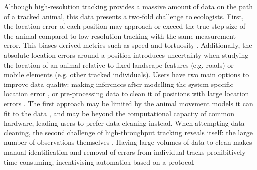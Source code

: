\documentclass[10pt,paper=a4,headings=standardclasses
]{scrartcl}
\begin{document}
Although high-resolution tracking provides a massive amount of data on the path of a tracked animal, this data presents a two-fold challenge to ecologists.
First, the location error of each position may approach or exceed the true step size of the animal compared to low-resolution tracking with the same measurement error.
This biases derived metrics such as speed and tortuosity \citep[see][]{ranacher2016, noonan2019, hurford2009, calenge2009}.
Additionally, the absolute location errors around a position introduces uncertainty when studying the location of an animal relative to fixed landscape features (e.g. roads) or mobile elements (e.g. other tracked individuals).
Users have two main options to improve data quality: making inferences after modelling the system-specific location error \citep{fleming2014a, fleming2020, jonsen2003, jonsen2005, johnson2008, patterson2008, aspillaga2021}, or pre-processing data to clean it of positions with large location errors \citep{bjorneraas2010}.
The first approach may be limited by the animal movement models it can fit to the data \citep{fleming2014a, noonan2019, fleming2020}, and may be beyond the computational capacity of common hardware, leading users to prefer data cleaning instead.
When attempting data cleaning, the second challenge of high-throughput tracking reveals itself: the large number of observations themselves \citep{weiser2016, toledo2020}.
Having large volumes of data to clean makes manual identification and removal of errors from individual tracks prohibitively time consuming, incentivising automation based on a protocol.
\end{document}
